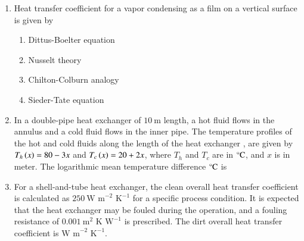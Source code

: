 \documentclass[journal,12pt,onecolumn]{IEEEtran}
\theoremstyle{remark}
\begin{document}
\begin{enumerate}
		\begin{enumerate}
		\end{enumerate}
		
		\item Heat transfer coefficient for a vapor condensing as a film on a vertical surface is given by
		
		\hfill{\brak{\text{GATE CH 2021}}}
		
		\begin{enumerate}
		\item Dittus-Boelter equation
		\item Nusselt theory
		\item Chilton-Colburn analogy
		\item Sieder-Tate equation
		\end{enumerate}
		
		\item In a double-pipe heat exchanger of $10~\text{m}$ length, a hot fluid flows in the annulus and a cold fluid flows in the inner pipe. The temperature profiles of the hot  and cold  fluids along the length of the heat exchanger , are given by $T_h\left(x\right) = 80 - 3x$ and $T_c\left(x\right) = 20 + 2x$, where $T_h$ and $T_c$ are in $\degree\text{C}$, and $x$ is in meter. The logarithmic mean temperature difference  $\degree\text{C}$ is
	
\hfill{}

\begin{enumerate}
\end{enumerate}

\item For a shell-and-tube heat exchanger, the clean overall heat transfer coefficient is calculated as $250~\text{W m}^{-2}\text{ K}^{-1}$ for a specific process condition. It is expected that the heat exchanger may be fouled during the operation, and a fouling resistance of $0.001~\text{m}^{2}\text{ K W}^{-1}$ is prescribed. The dirt overall heat transfer coefficient is \underline{\hspace{2cm}} $\text{W m}^{-2}\text{ K}^{-1}$.


\end{enumerate}
\end{document}
